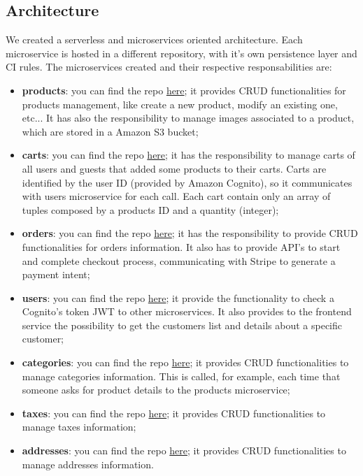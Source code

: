 \subsection{Architecture}
We created a serverless and microservices oriented architecture. Each microservice is hosted in a different repository, with it's own persistence layer and CI rules.
The microservices created and their respective responsabilities are:
\begin{itemize}
    \item \textbf{products}: you can find the repo \href{https://github.com/SWException/products}{here}; it provides CRUD functionalities for products management,
          like create a new product, modify an existing one, etc... It has also the responsibility to manage images associated to a product, which are
          stored in a Amazon S3 bucket;
    \item \textbf{carts}: you can find the repo \href{https://github.com/SWException/carts}{here}; it has the responsibility to manage carts of all users and guests that
          added some products to their carts. Carts are identified by the user ID (provided by Amazon Cognito), so it communicates with users microservice for each call.
          Each cart contain only an array of tuples composed by a products ID and a quantity (integer);
    \item \textbf{orders}: you can find the repo \href{https://github.com/SWException/orders}{here}; it has the responsibility to provide CRUD functionalities for orders information.
          It also has to provide API's to start and complete checkout process, communicating with Stripe to generate a payment intent;
    \item \textbf{users}: you can find the repo \href{https://github.com/SWException/users}{here}; it provide the functionality to check a Cognito's token JWT to other microservices.
          It also provides to the frontend service the possibility to get the customers list and details about a specific customer;
    \item \textbf{categories}: you can find the repo \href{https://github.com/SWException/categories}{here}; it provides CRUD functionalities to manage categories information.
          This is called, for example, each time that someone asks for product details to the products microservice;
    \item \textbf{taxes}: you can find the repo \href{https://github.com/SWException/taxes}{here}; it provides CRUD functionalities to manage taxes information;
    \item \textbf{addresses}: you can find the repo \href{https://github.com/SWException/addresses}{here}; it provides CRUD functionalities to manage addresses information.
\end{itemize}

